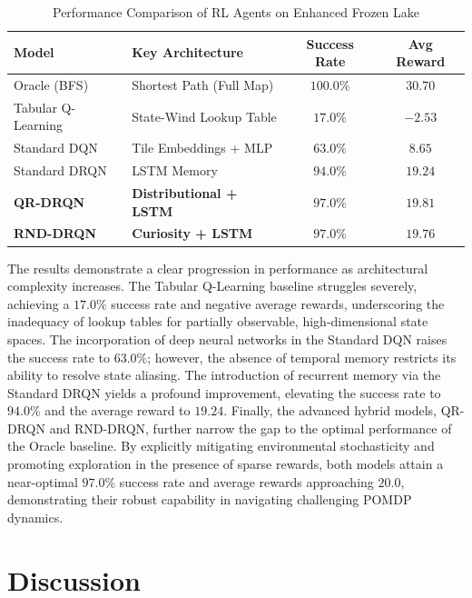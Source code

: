 \documentclass{article}
\begin{document}
\begin{table}[H]
    \centering
    \caption{Performance Comparison of RL Agents on Enhanced Frozen Lake}
    \label{results-table}
    \begin{tabularx}{\textwidth}{l X c c}
        \toprule
        \textbf{Model} & \textbf{Key Architecture} & \textbf{Success Rate} & \textbf{Avg Reward} \\
        \midrule
        Oracle (BFS) & Shortest Path (Full Map) & $100.0\%$ & $30.70$ \\
        \midrule
        Tabular Q-Learning & State-Wind Lookup Table & $17.0\%$ & $-2.53$ \\
        Standard DQN & Tile Embeddings + MLP & $63.0\%$ & $8.65$ \\
        Standard DRQN & LSTM Memory & $94.0\%$ & $19.24$ \\
        \textbf{QR-DRQN} & \textbf{Distributional + LSTM} & $\mathbf{97.0\%}$ & $\mathbf{19.81}$ \\
        \textbf{RND-DRQN} & \textbf{Curiosity + LSTM} & $\mathbf{97.0\%}$ & $19.76$ \\
        \bottomrule
    \end{tabularx}
\end{table}

The results demonstrate a clear progression in performance as architectural complexity increases. The Tabular Q-Learning baseline struggles severely, achieving a $17.0\%$ success rate and negative average rewards, underscoring the inadequacy of lookup tables for partially observable, high-dimensional state spaces. The incorporation of deep neural networks in the Standard DQN raises the success rate to $63.0\%$; however, the absence of temporal memory restricts its ability to resolve state aliasing. The introduction of recurrent memory via the Standard DRQN yields a profound improvement, elevating the success rate to $94.0\%$ and the average reward to $19.24$. Finally, the advanced hybrid models, QR-DRQN and RND-DRQN, further narrow the gap to the optimal performance of the Oracle baseline. By explicitly mitigating environmental stochasticity and promoting exploration in the presence of sparse rewards, both models attain a near-optimal $97.0\%$ success rate and average rewards approaching $20.0$, demonstrating their robust capability in navigating challenging POMDP dynamics.

\section{Discussion}
\end{document}
